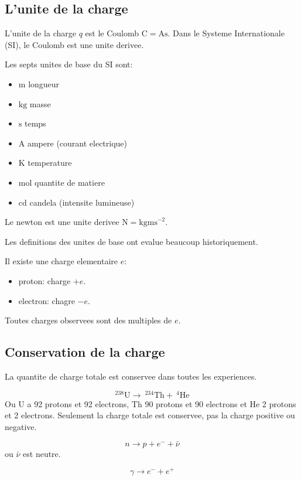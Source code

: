 \subsection{L'unite de la charge}

L'unite de la charge $q$ est le Coulomb $\mathrm{C}=\mathrm{As}$. Dans le Systeme Internationale (SI), le Coulomb est une unite derivee. 

Les septs unites de base du SI sont:
\begin{itemize}
\item $\mathrm{m}$ longueur
\item $\mathrm{kg}$ masse
\item $\mathrm{s}$ temps
\item $\mathrm{A}$ ampere (courant electrique)
\item $\mathrm{K}$ temperature
\item $\mathrm{mol}$ quantite de matiere
\item $\mathrm{cd}$ candela (intensite lumineuse)
\end{itemize}
\begin{example}
Le newton est une unite derivee $\mathrm{N}=\mathrm{kgms}^{-2}$.
\end{example}
\begin{remark}
Les definitions des unites de base ont evalue beaucoup historiquement.
\end{remark}

Il existe une charge elementaire $e$:
\begin{itemize}
\item proton: charge $+e$.
\item electron: chagre $-e$.
\end{itemize}
Toutes charges observees sont des multiples de $e$.

\subsection{Conservation de la charge}\label{section512}

La quantite de charge totale est conservee dans toutes les experiences.
\begin{example}
$$^{238}\mathrm{U}\to~^{234}\mathrm{Th}+~^{4}\mathrm{He}$$
Ou $\mathrm{U}$ a 92 protons et 92 electrons, $\mathrm{Th}$ 90 protons et 90 electrons et $\mathrm{He}$ 2 protons et 2 electrons. Seulement la charge totale est conservee, pas la charge positive ou negative.
\end{example}
\begin{example}
$$
n\to p+e^{-}+\bar{\nu}
$$
ou $\bar{\nu}$ est neutre.
\end{example}
\begin{example}
$$
\gamma \to e^{-}+e^{ + }
$$
\end{example}

